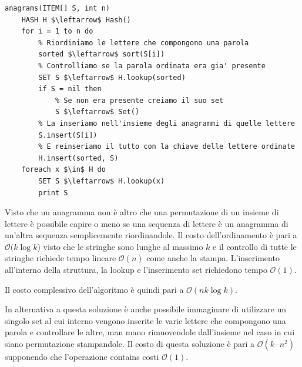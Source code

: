 \documentclass[../cheatSheetAlgoritmi.tex]{subfiles}
\begin{document}
\begin{lstlisting}[caption=anagrammi]
anagrams(ITEM[] S, int n)
	HASH H $\leftarrow$ Hash()
	for i = 1 to n do
		% Riordiniamo le lettere che compongono una parola
		sorted $\leftarrow$ sort(S[i])
		% Controlliamo se la parola ordinata era gia' presente
		SET S $\leftarrow$ H.lookup(sorted)
		if S = nil then
			% Se non era presente creiamo il suo set
			S $\leftarrow$ Set()
		% La inseriamo nell'insieme degli anagrammi di quelle lettere
		S.insert(S[i])
		% E reinseriamo il tutto con la chiave delle lettere ordinate
		H.insert(sorted, S)
	foreach x $\in$ H do
		SET S $\leftarrow$ H.lookup(x)
		print S
\end{lstlisting}
Visto che un anagramma non è altro che una permutazione di un insieme di lettere è possibile capire o meno se una sequenza di lettere è un anagramma di un'altra sequenza semplicemente riordinandole. Il costo dell'ordinamento è pari a $\mathcal{O}(k \log{k}$) visto che le stringhe sono lunghe al massimo $k$ e il controllo di tutte le stringhe richiede tempo lineare $\mathcal{O}(n)$ come anche la stampa. L'inserimento all'interno della struttura, la lookup e l'inserimento set richiedono tempo $\mathcal{O}(1)$.

Il costo complessivo dell'algoritmo è quindi pari a $\mathcal{O}(nk \log{k})$.

In alternativa a questa soluzione è anche possibile immaginare di utilizzare un singolo set al cui interno vengono inserite le varie lettere che compongono una parola e controllare le altre, man mano rimuovendole dall'insieme nel caso in cui siano permutazione stampandole. Il costo di questa soluzione è pari a $\mathcal{O}(k \cdot n^{2})$ supponendo che l'operazione contains costi $\mathcal{O}(1)$.
\newpage
\end{document}
